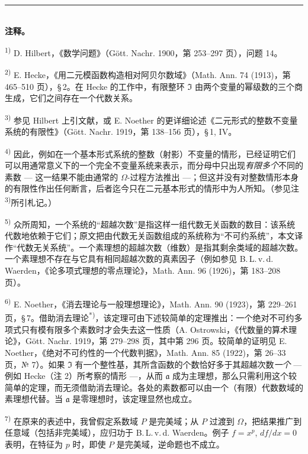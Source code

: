 \documentclass[11pt]{article}
\begin{document}
\begin{center}
\rule{4cm}{0.4pt}\\[0.6em]
\textbf{注释。}
\end{center}

{\small
\setlength{\parindent}{0pt}
\noindent\textsuperscript{1)} D. Hilbert，《数学问题》（Gött. Nachr. 1900，第 253--297 页），问题 14。

\noindent\textsuperscript{2)} E. Hecke，《用二元模函数构造相对阿贝尔数域》（Math. Ann. 74 (1913)，第 465--510 页），\S\,2。在 Hecke 的工作中，有限整环 $\mathfrak{I}$ 由两个变量的幂级数的三个商生成，它们之间存在一个代数关系。

\noindent\textsuperscript{3)} 参见 Hilbert 上引文献，或 E. Noether 的更详细论述《二元形式的整数不变量系统的有限性》（Gött. Nachr. 1919，第 138--156 页），\S\,1, IV。

\noindent\textsuperscript{4)} 因此，例如在一个基本形式系统的整数（射影）不变量的情形，已经证明它们可以用通常意义下的一个完全不变量系统来表示，而分母中只出现\emph{有限多个}不同的素数 --- 这一结果不能由通常的 $\Omega$-过程方法推出 ---；但这并没有对整数情形本身的有限性作出任何断言，后者迄今只在二元基本形式的情形中为人所知。（参见注\textsuperscript{3)}所引札记。）

\noindent\textsuperscript{5)} 众所周知，一个系统的“超越次数”是指这样一组代数无关函数的数目：该系统代数地依赖于它们；原文把由代数无关函数组成的系统称为“不可约系统”，本文译作“代数无关系统”。一个素理想的超越次数（维数）是指其剩余类域的超越次数。一个素理想不存在与它具有相同超越次数的真素因子（例如参见 B.\,L.\,v.\,d. Waerden，《论多项式理想的零点理论》，Math. Ann. 96 (1926)，第 183--208 页）。

\noindent\textsuperscript{6)} E. Noether，《消去理论与一般理想理论》，Math. Ann. 90 (1923)，第 229--261 页，\S\,7。借助消去理论\textsuperscript{*)}，该定理可由下述较简单的定理推出：一个绝对不可约多项式只有模有限多个素数时才会失去这一性质（A. Ostrowski，《代数量的算术理论》，Gött. Nachr. 1919，第 279--298 页，其中第 296 页。较简单的证明见 E. Noether，《绝对不可约性的一个代数判据》，Math. Ann. 85 (1922)，第 26--33 页，№ 7）。如果 $\mathfrak{I}$ 有一个整性基，其所含函数的个数恰好多于其超越次数\emph{一个} --- 例如 Hecke（注 2）所考察的情形 ---，从而 $\mathfrak{a}$ 成为主理想，那么只需利用这个较简单的定理，而无须借助消去理论。各处的素数都可以由一个（有限）代数数域的素理想代替。当 $\mathfrak{a}$ 是零理想时，该定理显然也成立。

\noindent\textsuperscript{7)} 在原来的表述中，我曾假定系数域 $P$ 是完美域；从 $P$ 过渡到 $\Omega$，把结果推广到任意域（包括非完美域），应归功于 B.\,L.\,v.\,d. Waerden。例子 $f=x^p$, $df/dx=0$ 表明，在特征为 $p$ 时，即使 $P$ 是完美域，逆命题也不成立。

}
\end{document}
